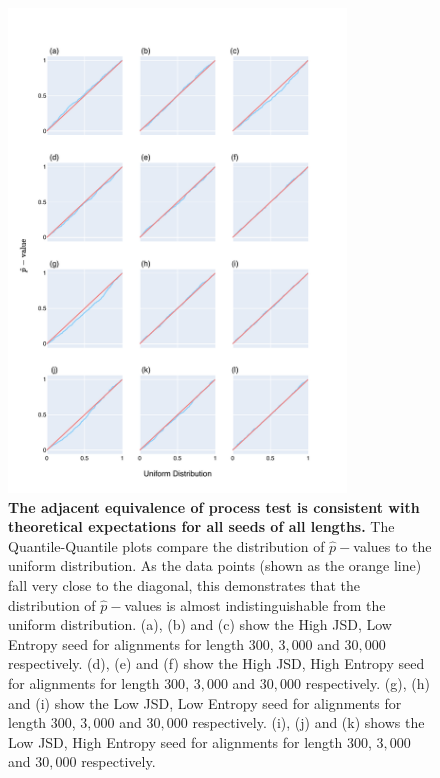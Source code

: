 \begin{figure}[!ht]
\centering
\includegraphics[width=0.8\textwidth]{figures/plots/synthetic/adj_eop/all_seeds.pdf}
\caption{\textbf{The adjacent equivalence of process test is consistent with theoretical expectations for all seeds of all lengths.} The Quantile-Quantile plots compare the distribution of $\hat p-$values to the uniform distribution. As the data points (shown as the orange line) fall very close to the diagonal, this demonstrates that the distribution of $\hat p-$values is almost indistinguishable from the uniform distribution. (a), (b) and (c) show the High JSD, Low Entropy seed for alignments for length $300$, $3,000$ and $30,000$ respectively. (d), (e) and (f) show the High JSD, High Entropy seed for alignments for length $300$, $3,000$ and $30,000$ respectively. (g), (h) and (i) show the Low JSD, Low Entropy seed for alignments for length $300$, $3,000$ and $30,000$ respectively. (i), (j) and (k) shows the Low JSD, High Entropy seed for alignments for length $300$, $3,000$ and $30,000$ respectively.}
\label{fig:synthetic/adj_eop/all_seeds}
\end{figure}